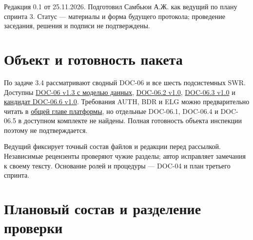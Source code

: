 \documentclass[12pt,a4paper]{article}
\begin{document}
Редакция 0.1 от 25.11.2026. Подготовил Самбьюи А.Ж. как ведущий по плану спринта 3. Статус --- материалы и форма будущего протокола; проведение заседания, решения и подписи не подтверждены.

\section{Объект и готовность пакета}\label{ux43eux431ux44aux435ux43aux442-ux438-ux433ux43eux442ux43eux432ux43dux43eux441ux442ux44c-ux43fux430ux43aux435ux442ux430}

\hypertarget{объект-и-готовность-пакета}{}

По задаче 3.4 рассматривают сводный DOC-06 и все шесть подсистемных SWR. Доступны {\href{../07\_Программные\_требования/DOC-06\_Программные\_требования.pdf\#doc-06-сводные-программные-требования}{DOC-06 v1.3 с моделью данных}}, {\href{../07\_Программные\_требования/DOC-06.2\_Сессии\_задач\_и\_планировщик.pdf\#doc-062-сессии-задач-и-планировщик}{DOC-06.2 v1.0}}, {\href{../07\_Программные\_требования/DOC-06.3\_Ранцевые\_криптосистемы.pdf\#doc-063-ранцевые-криптосистемы}{DOC-06.3 v1.0}} и {\href{../07\_Программные\_требования/DOC-06.6\_Конфигурации\_и\_модерация.pdf\#doc-066-шаблоны-наборов-задач-и-модерация}{кандидат DOC-06.6 v1.0}}. Требования AUTH, BDR и ELG можно предварительно читать в {\href{../07\_Программные\_требования/DOC-06\_Программные\_требования.pdf\#doc-06-программные-требования-платформы}{общей главе платформы}}, но отдельные DOC-06.1, DOC-06.4 и DOC-06.5 в доступном комплекте не найдены. Полная готовность объекта инспекции поэтому не подтверждается.

Ведущий фиксирует точный состав файлов и редакции перед рассылкой. Независимые рецензенты проверяют чужие разделы; автор исправляет замечания к своему тексту. Основание ролей и процедуры --- DOC-04 и план третьего спринта.

\section{Плановый состав и разделение проверки}\label{ux43fux43bux430ux43dux43eux432ux44bux439-ux441ux43eux441ux442ux430ux432-ux438-ux440ux430ux437ux434ux435ux43bux435ux43dux438ux435-ux43fux440ux43eux432ux435ux440ux43aux438}

\hypertarget{плановый-состав-и-разделение-проверки}{}
\end{document}

